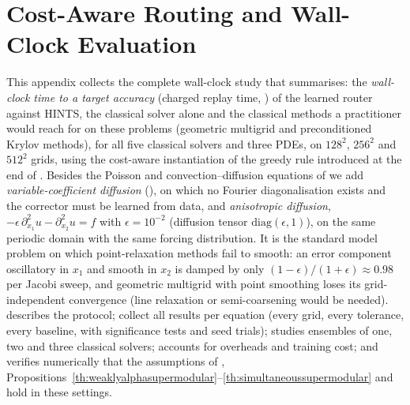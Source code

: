 \section{Cost-Aware Routing and Wall-Clock Evaluation} \label{sec:wallclock}

This appendix collects the complete wall-clock study that  summarises: the \emph{wall-clock time to a target accuracy} (charged replay time, ) of the learned router against HINTS, the classical solver alone and the classical methods a practitioner would reach for on these problems (geometric multigrid and preconditioned Krylov methods), for all five classical solvers and three PDEs, on $128^2$, $256^2$ and $512^2$ grids, using the cost-aware instantiation of the greedy rule introduced at the end of . Besides the Poisson and convection--diffusion equations of  we add \emph{variable-coefficient diffusion} (), on which no Fourier diagonalisation exists and the corrector must be learned from data, and \emph{anisotropic diffusion}, $-\epsilon\,\partial_{x_1}^2 u - \partial_{x_2}^2 u = f$ with $\epsilon = 10^{-2}$ (diffusion tensor $\mathrm{diag}(\epsilon, 1)$), on the same periodic domain with the same forcing distribution. It is the standard model problem on which point-relaxation methods fail to smooth: an error component oscillatory in $x_1$ and smooth in $x_2$ is damped by only $(1-\epsilon)/(1+\epsilon) \approx 0.98$ per Jacobi sweep, and geometric multigrid with point smoothing loses its grid-independent convergence (line relaxation or semi-coarsening would be needed).  describes the protocol;  collect all results per equation (every grid, every tolerance, every baseline, with significance tests and seed trials);  studies ensembles of one, two and three classical solvers;  accounts for overheads and training cost; and  verifies numerically that the assumptions of , Propositions~\ref{th:weaklyalphasupermodular}--\ref{th:simultaneoussupermodular} and  hold in these settings.

